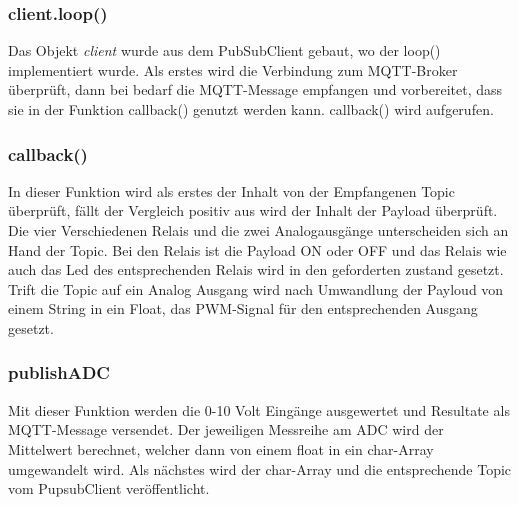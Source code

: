 \subsubsection{client.loop()}
 Das Objekt \textit{client} wurde aus dem PubSubClient gebaut, wo der loop() implementiert wurde. Als erstes wird die Verbindung zum MQTT-Broker überprüft, dann bei bedarf die MQTT-Message empfangen und vorbereitet, dass sie in der Funktion callback()  genutzt werden kann. callback() wird aufgerufen.
 \subsubsection{callback()}
 In dieser Funktion wird als erstes der Inhalt von der Empfangenen Topic überprüft, fällt der Vergleich positiv aus wird der Inhalt der Payload überprüft. Die vier Verschiedenen Relais und die zwei Analogausgänge unterscheiden sich an Hand der Topic. Bei den Relais ist die Payload ON oder OFF und das Relais wie auch das Led des entsprechenden Relais wird in den geforderten zustand gesetzt. Trift die Topic auf ein Analog Ausgang wird nach Umwandlung der Payloud von einem String in ein Float, das PWM-Signal für den entsprechenden Ausgang gesetzt.
 \subsubsection{publishADC}
Mit dieser Funktion werden die 0-10 Volt Eingänge ausgewertet und Resultate als MQTT-Message versendet. Der jeweiligen Messreihe am ADC wird der Mittelwert berechnet, welcher dann von einem float in ein char-Array umgewandelt wird. Als nächstes wird der char-Array und die entsprechende Topic vom PupsubClient veröffentlicht.

\newpage

